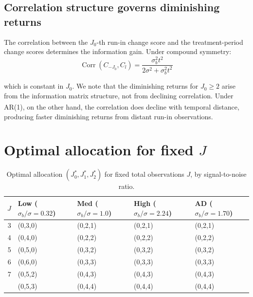 \documentclass[
  11pt,
]{article}
\begin{document}
\subsection{Correlation structure governs diminishing returns}\label{correlation-structure-governs-diminishing-returns}

The correlation between the \(J_0\)-th run-in change
score and the treatment-period change scores
determines the information gain. Under compound
symmetry:
\begin{equation}
  \mathop{\mathrm{Corr}}(C_{-J_0}, C_l) = \frac{\sigma_b^2 t^2}
    {2\sigma^2 + \sigma_b^2 t^2}
\end{equation}

which is constant in \(J_0\). We note that the diminishing
returns for \(J_0 \ge 2\) arise from the information
matrix structure, not from declining correlation. Under
AR(1)\textsuperscript{}, on the other hand, the correlation
does decline with temporal distance, producing faster
diminishing returns from distant run-in observations.

\section{\texorpdfstring{Optimal allocation for fixed \(J\)}{Optimal allocation for fixed J}}\label{optimal-allocation-for-fixed-j}

\begin{table}

\caption{\label{tab:optimal-grid}Optimal allocation $(J_0^*, J_1^*, J_2^*)$ for fixed total observations $J$, by signal-to-noise ratio.}
\centering
\begin{tabular}[t]{rllll}
\toprule
$J$ & Low ($\sigma_b/\sigma=0.32$) & Med ($\sigma_b/\sigma=1.0$) & High ($\sigma_b/\sigma=2.24$) & AD ($\sigma_b/\sigma=1.70$)\\
\midrule
3 & (0,3,0) & (0,2,1) & (0,2,1) & (0,2,1)\\
4 & (0,4,0) & (0,2,2) & (0,2,2) & (0,2,2)\\
5 & (0,5,0) & (0,3,2) & (0,3,2) & (0,3,2)\\
6 & (0,6,0) & (0,3,3) & (0,3,3) & (0,3,3)\\
7 & (0,5,2) & (0,4,3) & (0,4,3) & (0,4,3)\\
\addlinespace
8 & (0,5,3) & (0,4,4) & (0,4,4) & (0,4,4)\\
\bottomrule
\end{tabular}
\end{table}
\end{document}
